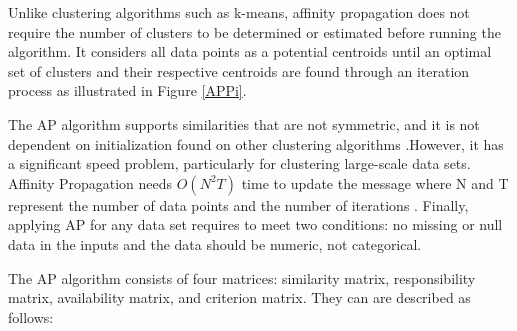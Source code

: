 \documentclass[../UNBThesis2.tex]{subfiles}
\begin{document}


Unlike clustering algorithms such as k-means, affinity propagation does not require the number of clusters to be determined or estimated before running the algorithm. It considers all data points as a potential centroids until an optimal set of clusters and their respective centroids are found through an iteration process as illustrated in Figure \ref{APPi}. 




The AP algorithm supports similarities that are not symmetric, and it is not dependent on initialization found on other clustering algorithms \cite{refianti2017time}.However, it has a significant speed problem, particularly for clustering large-scale data sets. Affinity Propagation needs $O(N^2T)$ time to update the message where N and T represent the number of data points and the number of iterations \cite{frey2007clustering}. Finally, applying AP for any data set requires to meet two conditions: no missing or null data in the inputs and the data should be numeric, not categorical.


The AP algorithm consists of four matrices: similarity matrix, responsibility matrix, availability matrix, and criterion matrix. They can are described as follows:
\end{document}
